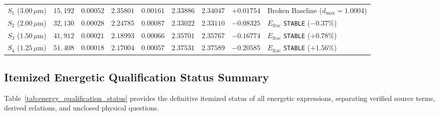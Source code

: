 \begin{table}[htbp]
\begin{tabular*}{\textwidth}{@{\extracolsep{\fill}}lrrrrrrrl@{}}
$S_1$ ($3.00\,\mu\mathrm{m}$) & $15{,}192$ & $0.00052$ & $2.35801$ & $0.00161$ & $2.33886$ & $2.34047$ & $+0.01754$ & Broken Baseline ($d_{\max}=1.0004$) \\
$S_2$ ($2.00\,\mu\mathrm{m}$) & $32{,}130$ & $0.00028$ & $2.24785$ & $0.00087$ & $2.33022$ & $2.33110$ & $-0.08325$ & $E_{\mathrm{frac}}$ \texttt{STABLE} ($-0.37\%$) \\
$S_3$ ($1.50\,\mu\mathrm{m}$) & $41{,}912$ & $0.00021$ & $2.18993$ & $0.00066$ & $2.35701$ & $2.35767$ & $-0.16774$ & $E_{\mathrm{frac}}$ \texttt{STABLE} ($+0.78\%$) \\
$S_4$ ($1.25\,\mu\mathrm{m}$) & $51{,}408$ & $0.00018$ & $2.17004$ & $0.00057$ & $2.37531$ & $2.37589$ & $-0.20585$ & $E_{\mathrm{frac}}$ \texttt{STABLE} ($+1.56\%$) \\
\bottomrule
\end{tabular*}
\end{table}

\subsection{Itemized Energetic Qualification Status Summary}
Table~\ref{tab:energy_qualification_status} provides the definitive itemized status of all energetic expressions, separating verified source terms, derived relations, and unclosed physical questions.

